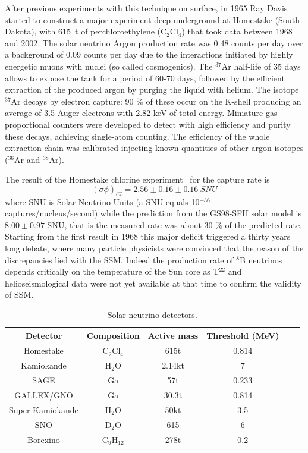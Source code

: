 After previous experiments with this technique on surface, in 1965 Ray  Davis started  to construct a major experiment deep underground at Homestake (South Dakota), with 615~t of perchloroethylene (C$_2$Cl$_4$) that took data between 1968 and 2002.
The solar neutrino Argon production rate was 0.48 counts per day over a background of 0.09 counts per day due to the interactions initiated by highly energetic muons with nuclei (so called cosmogenics).
The $^{37}$Ar half-life of 35 days allows to expose the tank for a period of 60-70 days, followed by the efficient extraction of the produced argon by purging the liquid with helium.  
The isotope $^{37}$Ar decays by electron capture: 90 \% of these occur on the K-shell producing an average of 3.5 Auger electrons with 2.82 keV of total energy. Miniature gas proportional counters were developed to detect with high efficiency and purity these decays, achieving single-atom counting.
The efficiency of the whole extraction chain was calibrated injecting known quantities of other argon isotopes ($^{36}$Ar and $^{38}$Ar).  

The result of the Homestake chlorine experiment~\cite{cleveland} for the capture rate  is
\begin{equation}
(\sigma \phi)_{Cl} = 2.56 \pm 0.16 \pm 0.16 \: SNU
\end{equation}
where SNU is Solar Neutrino Units (a SNU equals 10$^{-36}$ captures/nucleus/second) while the prediction from the GS98-SFII solar model is $8.00 \pm 0.97$ SNU, that is the measured rate was about 30 \% of the predicted rate.  
Starting from the first result in 1968 this major deficit triggered a thirty years long debate, where many particle physicists were convinced that the reason of the discrepancies lied with the SSM. Indeed the production rate of $ {^8}$B neutrinos depends critically on the temperature of the Sun core as T$^{22}$ and helioseismological data were not yet available at that time to confirm the validity of SSM. 

\begin{table}
\caption{Solar neutrino detectors.}
\centering
\begin{tabular}{|c|c|c|c|c|c|}
  \hline
  Detector & Composition & Active mass & Threshold (MeV)  \\ 
  \hline
Homestake & C$_2$Cl$_4$ & 615t &  0.814 \\
Kamiokande & H$_2$O & 2.14kt &  7  \\
SAGE & Ga & 57t &  0.233 \\
GALLEX/GNO & Ga & 30.3t &  0.814  \\
Super-Kamiokande &  H$_2$O & 50kt &  3.5 \\
SNO & D$_2$O & 615 &  6\\
Borexino & C$_9$H$_{12}$ & 278t &  0.2  \\
  \hline
\end{tabular}

\label{tab:snudet}
\end{table}

